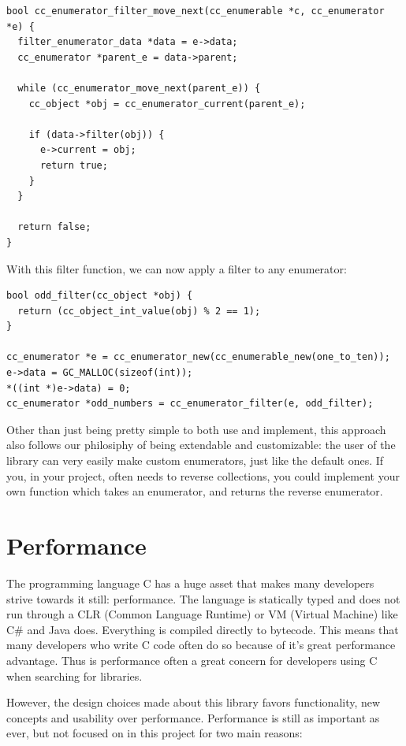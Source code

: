 \documentclass[table]{ituthesis}
\begin{document}
\begin{lstlisting}[label=cc_enumerator-filter-move_next,caption=Custom enumerator filter]
bool cc_enumerator_filter_move_next(cc_enumerable *c, cc_enumerator *e) {
  filter_enumerator_data *data = e->data;
  cc_enumerator *parent_e = data->parent;

  while (cc_enumerator_move_next(parent_e)) {
    cc_object *obj = cc_enumerator_current(parent_e);
  
    if (data->filter(obj)) {
      e->current = obj;
      return true;
    }
  }

  return false;
}
\end{lstlisting}	    

	With this filter function, we can now apply a filter to any enumerator:

\begin{lstlisting}[label=cc_enumerator-custom-filter,caption=Custom filter example]
bool odd_filter(cc_object *obj) {
  return (cc_object_int_value(obj) % 2 == 1);
}

cc_enumerator *e = cc_enumerator_new(cc_enumerable_new(one_to_ten));
e->data = GC_MALLOC(sizeof(int));
*((int *)e->data) = 0;
cc_enumerator *odd_numbers = cc_enumerator_filter(e, odd_filter);
\end{lstlisting}	

	Other than just being pretty simple to both use and implement, this approach also follows our philosiphy of being extendable and customizable: the user of the library can very easily make custom enumerators, just like the default ones. If you, in your project, often needs to reverse collections, you could implement your own function which takes an enumerator, and returns the reverse enumerator.
	

\section{Performance}

The programming language C has a huge asset that makes many developers strive towards it still: performance. The language is statically typed and does not run through a CLR (Common Language Runtime) or VM (Virtual Machine) like C\# and Java does. Everything is compiled directly to bytecode. This means that many developers who write C code often do so because of it's great performance advantage. Thus is performance often a great concern for developers using C when searching for libraries. 

However, the design choices made about this library favors functionality, new concepts and usability over performance. Performance is still as important as ever, but not focused on in this project for two main reasons:
\end{document}

